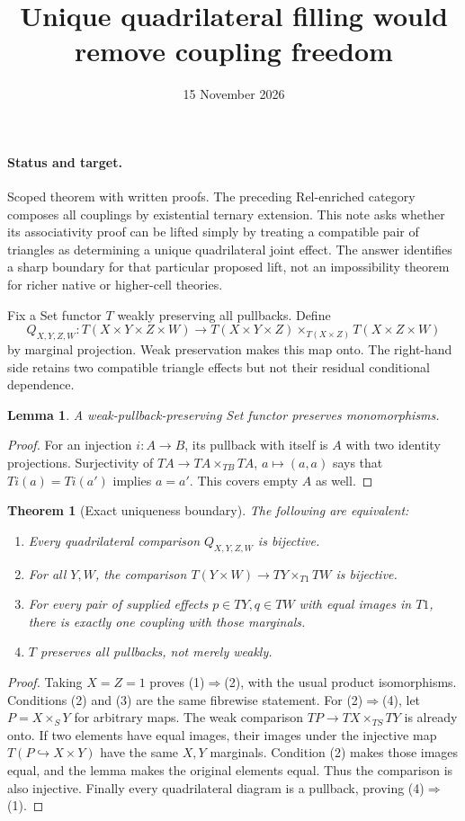 \documentclass[11pt]{article}
\title{Unique quadrilateral filling would remove coupling freedom}
\date{15 November 2026}
\newtheorem{theorem}{Theorem}\newtheorem{lemma}{Lemma}
\begin{document}
\maketitle
\paragraph{Status and target.} Scoped theorem with written proofs. The preceding Rel-enriched category composes all couplings by existential ternary extension. This note asks whether its associativity proof can be lifted simply by treating a compatible pair of triangles as determining a unique quadrilateral joint effect. The answer identifies a sharp boundary for that particular proposed lift, not an impossibility theorem for richer native or higher-cell theories.

Fix a Set functor $T$ weakly preserving all pullbacks. Define
\[
 Q_{X,Y,Z,W}:T(X\times Y\times Z\times W)\longrightarrow
 T(X\times Y\times Z)\times_{T(X\times Z)}T(X\times Z\times W)
\]
by marginal projection. Weak preservation makes this map onto. The right-hand side retains two compatible triangle effects but not their residual conditional dependence.

\begin{lemma}
A weak-pullback-preserving Set functor preserves monomorphisms.
\end{lemma}
\begin{proof}
For an injection $i:A\to B$, its pullback with itself is $A$ with two identity projections. Surjectivity of $TA\to TA\times_{TB}TA$, $a\mapsto(a,a)$ says that $Ti(a)=Ti(a')$ implies $a=a'$. This covers empty $A$ as well.
\end{proof}

\begin{theorem}[Exact uniqueness boundary]
The following are equivalent:
\begin{enumerate}
\item Every quadrilateral comparison $Q_{X,Y,Z,W}$ is bijective.
\item For all $Y,W$, the comparison $T(Y\times W)\to TY\times_{T1}TW$ is bijective.
\item For every pair of supplied effects $p\in TY,q\in TW$ with equal images in $T1$, there is exactly one coupling with those marginals.
\item $T$ preserves all pullbacks, not merely weakly.
\end{enumerate}
\end{theorem}
\begin{proof}
Taking $X=Z=1$ proves (1)$\Rightarrow$(2), with the usual product isomorphisms. Conditions (2) and (3) are the same fibrewise statement. For (2)$\Rightarrow$(4), let $P=X\times_S Y$ for arbitrary maps. The weak comparison $TP\to TX\times_{TS}TY$ is already onto. If two elements have equal images, their images under the injective map $T(P\hookrightarrow X\times Y)$ have the same $X,Y$ marginals. Condition (2) makes those images equal, and the lemma makes the original elements equal. Thus the comparison is also injective. Finally every quadrilateral diagram is a pullback, proving (4)$\Rightarrow$(1).
\end{proof}
\end{document}
